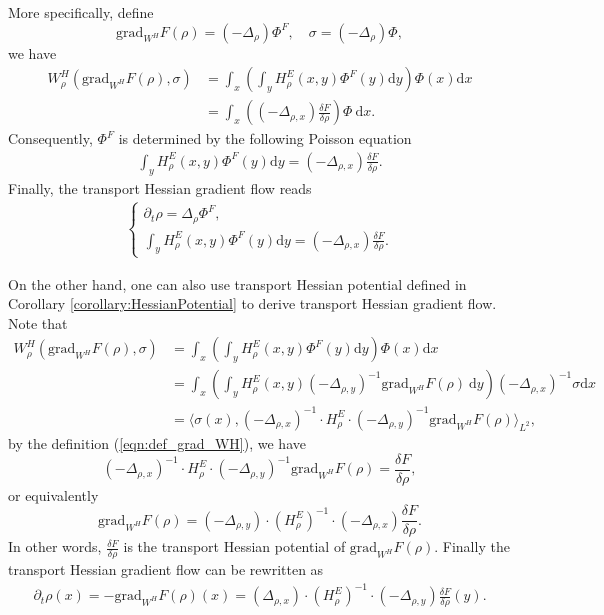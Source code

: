 \documentclass[11pt]{book}
\begin{document}
More specifically, define 
\[
\text{grad}_{W^H}F(\rho) = (-\Delta_{\rho})\Phi^F, \quad \sigma =  (-\Delta_{\rho})\Phi,
\]
we have
\begin{align*}
W_{\rho}^H(\text{grad}_{W^H}F(\rho),\sigma) &=  \int_x \left( \int_y H^E_{\rho}(x,y) \Phi^F(y)\text{d}y \right) \Phi(x) \text{d}x \\
& = \int_x \left( (-\Delta_{\rho,x})\frac{\delta F}{\delta\rho} \right) \Phi \ \text{d}x.
\end{align*}
Consequently, $\Phi^F$ is determined by the following Poisson equation
\begin{align}\label{eqn:Poisson}
\int_y H^E_{\rho}(x,y) \Phi^F(y)\text{d}y = (-\Delta_{\rho,x})\frac{\delta F}{\delta\rho}.
\end{align}
Finally, the transport Hessian gradient flow reads
\begin{align}\label{eqn:TransportHessianGradient}
\begin{cases}
\partial_t \rho = \Delta_{\rho}\Phi^F, \\
\int_y H^E_{\rho}(x,y) \Phi^F(y)\text{d}y = (-\Delta_{\rho,x})\frac{\delta F}{\delta\rho}.
\end{cases}
\end{align}

On the other hand, one can also use transport Hessian potential defined in Corollary \ref{corollary:HessianPotential} to derive transport Hessian gradient flow. Note that 
\begin{align*}
W_{\rho}^H(\text{grad}_{W^H}F(\rho),\sigma) &=  \int_x \left( \int_y H^E_{\rho}(x,y) \Phi^F(y)\text{d}y \right) \Phi(x) \text{d}x \\
& = \int_x \left( \int_y H^E_{\rho}(x,y) (-\Delta_{\rho,y})^{-1}\text{grad}_{W^H}F(\rho) \ \text{d}y \right) (-\Delta_{\rho,x})^{-1}\sigma \text{d}x \\
& = \Big\langle \sigma(x), (-\Delta_{\rho,x})^{-1}\cdot H_{\rho}^E \cdot(-\Delta_{\rho,y})^{-1}\text{grad}_{W^H}F(\rho)\Big\rangle_{L^2},
\end{align*}
by the definition (\ref{eqn:def_grad_WH}), we have 
\[
(-\Delta_{\rho,x})^{-1}\cdot H_{\rho}^E \cdot(-\Delta_{\rho,y})^{-1}\text{grad}_{W^H}F(\rho) = \frac{\delta F}{\delta\rho},
\]
or equivalently
\[
\text{grad}_{W^H}F(\rho) = (-\Delta_{\rho,y})\cdot (H_{\rho}^E)^{-1} \cdot(-\Delta_{\rho,x}) \frac{\delta F}{\delta\rho}.
\]
In other words,  $\frac{\delta F}{\delta\rho}$ is the transport Hessian potential of $\text{grad}_{W^H}F(\rho)$. Finally the transport Hessian gradient flow can be rewritten as
\begin{align}
\partial_t\rho(x) = -\text{grad}_{W^H}F(\rho)(x) = (\Delta_{\rho,x})\cdot (H_{\rho}^E)^{-1} \cdot(-\Delta_{\rho,y}) \frac{\delta F}{\delta\rho}(y).
\end{align}
\end{document}
